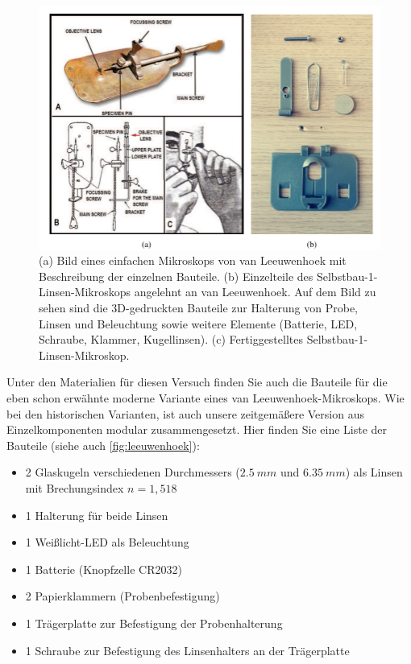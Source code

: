 \documentclass[ngerman]{scrartcl}
\begin{document}
\begin{figure}[H]
    \centering
    \begin{samepage}
        \includegraphics[width=\linewidth]{fig/Leeuwenhoek.png}
        \caption[Aufbau eines van Leeuwenhoek Mikroskops]{(a) Bild eines einfachen Mikroskops von van Leeuwenhoek mit Beschreibung der einzelnen Bauteile. (b) Einzelteile des        Selbstbau-1-Linsen-Mikroskops angelehnt an van Leeuwenhoek. Auf dem Bild zu sehen sind die 3D-gedruckten Bauteile zur Halterung von Probe, Linsen und Beleuchtung sowie weitere Elemente (Batterie, LED, Schraube, Klammer, Kugellinsen). (c) Fertiggestelltes Selbstbau-1-Linsen-Mikroskop.}
        \label{fig:leeuwenhoek}
    \end{samepage}
\end{figure}

Unter den Materialien für diesen Versuch finden Sie auch die Bauteile für die eben schon erwähnte moderne Variante eines van Leeuwenhoek-Mikroskops. Wie bei den historischen Varianten, ist auch unsere zeitgemäßere Version aus Einzelkomponenten modular zusammengesetzt. Hier finden Sie eine Liste der Bauteile (siehe auch
\autoref{fig:leeuwenhoek}):
\begin{itemize}
    \item 2 Glaskugeln verschiedenen Durchmessers ($\SI{2,5}{mm}$ und $\SI{6,35}{mm}$) als Linsen mit Brechungsindex $n = 1,518$
    \item 1 Halterung für beide Linsen
    \item 1 Weißlicht-LED als Beleuchtung
    \item 1 Batterie (Knopfzelle CR2032)
    \item 2 Papierklammern (Probenbefestigung)
    \item 1 Trägerplatte zur Befestigung der Probenhalterung
    \item 1 Schraube zur Befestigung des Linsenhalters an der Trägerplatte
\end{itemize}
\end{document}

